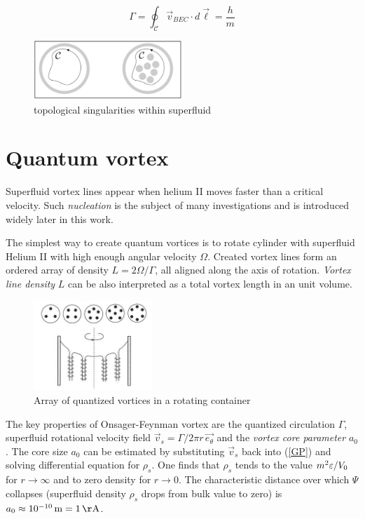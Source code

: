 \begin{equation}
\Gamma = \oint_{\mathcal{C}} \vec{v}_{BEC} \cdot \unit{d}\vec{\boldsymbol{\ell}} = \frac{h}{m}
\label{gamma}
\end{equation}

\begin{figure}[h]
	\centering
	\includegraphics[width=0.5\textwidth]{graphics/theory/singularity}
	\caption{topological singularities within superfluid}
	\label{singularity}
\end{figure}


\section{Quantum vortex}

Superfluid vortex lines appear when helium II moves faster than a critical velocity. Such \textit{nucleation} is the subject of many investigations and is introduced widely later in this work.

The simplest way to create quantum vortices is to rotate cylinder with superfluid Helium II with high enough angular velocity $\Omega$. Created vortex lines form an ordered array of density $L=2\Omega / \Gamma$, all aligned along the axis of rotation. \textit{Vortex line density} $L$ can be also interpreted as a total vortex length in an unit volume.

\begin{figure}[h]
	\centering
	\includegraphics[width=0.4\textwidth]{graphics/theory/rotating-helium}
	\caption{Array of quantized vortices in a rotating container}
	\label{rotating-helium}
\end{figure}

The key properties of Onsager-Feynman vortex are the quantized circulation $\Gamma$, superfluid rotational velocity field $\vec{v}_s = \Gamma / 2\pi r\, \vec{e_{\theta}}$ and the \textit{vortex core parameter} $a_0$. The core size $a_0$ can be estimated by substituting $\vec{v}_s$ back into (\ref{GP}) and solving differential equation for $\rho_s$. One finds that $\rho_s$ tends to the value $m^2 \varepsilon / V_0$ for $r \rightarrow \infty$ and to zero density for $r \rightarrow 0$.
The characteristic distance over which $\Psi$ collapses (superfluid density $\rho_s$ drops from bulk value to zero) is $a_0 \approx 10^{-10} \unit{m} = 1 \unit{\AA}$.

